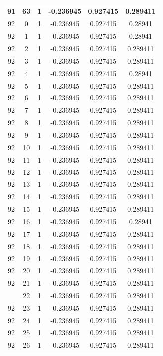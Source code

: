 \documentclass[12pt,a4paper]{article}
\numberwithin{equation}{section}
\numberwithin{figure}{section}
\numberwithin{table}{section}
\begin{document}
\begin{longtable}{|c|c|c|c|c|c|}
91 & 63 & 1 & -0.236945 & 0.927415 & 0.289411 \\ \hline
92 & 0 & 1 & -0.236945 & 0.927415 & 0.28941 \\ \hline
92 & 1 & 1 & -0.236945 & 0.927415 & 0.28941 \\ \hline
92 & 2 & 1 & -0.236945 & 0.927415 & 0.289411 \\ \hline
92 & 3 & 1 & -0.236945 & 0.927415 & 0.289411 \\ \hline
92 & 4 & 1 & -0.236945 & 0.927415 & 0.28941 \\ \hline
92 & 5 & 1 & -0.236945 & 0.927415 & 0.289411 \\ \hline
92 & 6 & 1 & -0.236945 & 0.927415 & 0.289411 \\ \hline
92 & 7 & 1 & -0.236945 & 0.927415 & 0.289411 \\ \hline
92 & 8 & 1 & -0.236945 & 0.927415 & 0.289411 \\ \hline
92 & 9 & 1 & -0.236945 & 0.927415 & 0.289411 \\ \hline
92 & 10 & 1 & -0.236945 & 0.927415 & 0.289411 \\ \hline
92 & 11 & 1 & -0.236945 & 0.927415 & 0.289411 \\ \hline
92 & 12 & 1 & -0.236945 & 0.927415 & 0.289411 \\ \hline
92 & 13 & 1 & -0.236945 & 0.927415 & 0.289411 \\ \hline
92 & 14 & 1 & -0.236945 & 0.927415 & 0.289411 \\ \hline
92 & 15 & 1 & -0.236945 & 0.927415 & 0.289411 \\ \hline
92 & 16 & 1 & -0.236945 & 0.927415 & 0.28941 \\ \hline
92 & 17 & 1 & -0.236945 & 0.927415 & 0.289411 \\ \hline
92 & 18 & 1 & -0.236945 & 0.927415 & 0.289411 \\ \hline
92 & 19 & 1 & -0.236945 & 0.927415 & 0.289411 \\ \hline
92 & 20 & 1 & -0.236945 & 0.927415 & 0.289411 \\ \hline
92 & 21 & 1 & -0.236945 & 0.927415 & 0.289411 \\ \hline
\pagebreak
92 & 22 & 1 & -0.236945 & 0.927415 & 0.289411 \\ \hline
92 & 23 & 1 & -0.236945 & 0.927415 & 0.289411 \\ \hline
92 & 24 & 1 & -0.236945 & 0.927415 & 0.289411 \\ \hline
92 & 25 & 1 & -0.236945 & 0.927415 & 0.289411 \\ \hline
92 & 26 & 1 & -0.236945 & 0.927415 & 0.289411 \\ \hline

\end{longtable}
\end{document}
